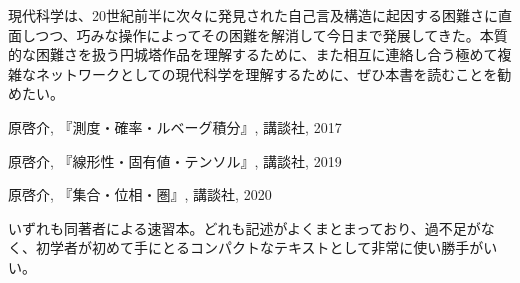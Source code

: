 \documentclass[10pt, a5paper, twoside]{jsarticle}
\theoremstyle{definition}
\begin{document}
		現代科学は、20世紀前半に次々に発見された自己言及構造に起因する困難さに直面しつつ、巧みな操作によってその困難を解消して今日まで発展してきた。本質的な困難さを扱う円城塔作品を理解するために、また相互に連絡し合う極めて複雑なネットワークとしての現代科学を理解するために、ぜひ本書を読むことを勧めたい。

		\begin{thebibliography}{9}

			 原啓介, 『測度・確率・ルベーグ積分』, 講談社, 2017

			 原啓介, 『線形性・固有値・テンソル』, 講談社, 2019

			 原啓介, 『集合・位相・圏』, 講談社, 2020

			いずれも同著者による速習本。どれも記述がよくまとまっており、過不足がなく、初学者が初めて手にとるコンパクトなテキストとして非常に使い勝手がいい。

		\end{thebibliography}
\end{document}
